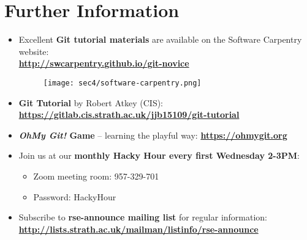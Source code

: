 \section{Further Information}\hypertarget{sec3}{}

\begin{frame}[fragile]
\emptyframetitle

\begin{itemize}
\setlength{\itemsep}{5pt}
  \item  Excellent \textbf{Git tutorial materials} are available on the Software Carpentry website:\\
  \textbf{\small\url{http://swcarpentry.github.io/git-novice}}\\
  \begin{figure}[h]
  \begin{center}
    \texttt{[image: sec4/software-carpentry.png]}
  \end{center}
  \end{figure}

  \item \textbf{Git Tutorial} by Robert Atkey (CIS):
  \textbf{\small\url{https://gitlab.cis.strath.ac.uk/jjb15109/git-tutorial}}

  \item \textbf{\textit{OhMy Git!} Game} -- learning the playful way:
  \textbf{\small\url{https://ohmygit.org}}

  \item Join us at our \textbf{monthly Hacky Hour every first Wednesday 2-3PM}:
  \begin{itemize}
    \item[] \normalsize Zoom meeting room: 957-329-701
    \item[] \normalsize Password: HackyHour
  \end{itemize}

  \item Subscribe to \textbf{rse-announce mailing list} for regular information:\\
  \textbf{\small\url{http://lists.strath.ac.uk/mailman/listinfo/rse-announce}}
\end{itemize}

\end{frame}

